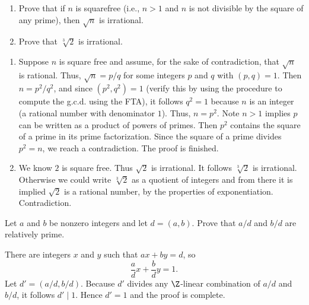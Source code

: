 \begin{questions}

\question
    \begin{enumerate}[label=(\alph*)]
        \item Prove that if \(n\) is squarefree (i.e., \(n>1\) and \(n\) is not divisible by the square of any prime), then \(\sqrt{n}\) is irrational.
        \item Prove that \(\sqrt[3]{2}\) is irrational.
    \end{enumerate}


\begin{theproof}
\begin{enumerate}[label=(\alph*)]
    \item Suppose \(n\) is square free  and assume, for the sake of contradiction, that \(\sqrt{n}\) is rational.
    Thus, \(\sqrt{n}= p/q\) for some integers \(p\) and \(q\) with \((p,q)=1\).
    Then \(n = p^2 / q^2\), and since \((p^2, q^2) = 1\) (verify this by using the procedure to compute the g.c.d. using the FTA), it follows \(q^2 = 1\) because \(n\) is an integer (a rational number with denominator \(1\)). 
    Thus, \(n= p^2\). Note \(n>1\) implies \(p\) can be written as a product of powers of primes. 
    Then \(p^2\) contains the square of a prime in its prime factorization. Since the square of a prime divides \(p^2=n\), we reach a contradiction. The proof is finished.

    \item We know \(2\) is square free. Thus \(\sqrt{2}\) is irrational. It follows \(\sqrt[3]{2}\) is irrational. Otherwise we could write \(\sqrt[3]{2}\) as a quotient of integers and from there it is implied \(\sqrt{2}\) is a rational number, by the properties of exponentiation. Contradiction.
\end{enumerate}
\end{theproof}


\question
Let \(a\) and \(b\) be nonzero integers and let \(d=(a, b)\). Prove that \(a / d\) and \(b / d\) are relatively prime.
\begin{theproof}
    There are integers \(x\) and \(y\) such that \( ax+ by = d\), so
    \[\frac{a}{d}x + \frac{b}{d}y = 1.\] 
    Let \(d' = (a/d, b/d)\).
    Because \(d'\) divides any \(\Z\)-linear combination of \(a/d\) and \(b/d\), it follows \(d'\mid 1\). 
    Hence \(d'=1\) and the proof is complete.
\end{theproof}



\end{questions}

